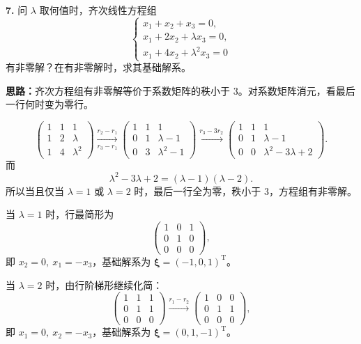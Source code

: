 \else \answerarea[10] \fi%

\textbf{7.} 问 \(\lambda\) 取何值时，齐次线性方程组
\[
\begin{cases}
x_1+x_2+x_3=0,\\
x_1+2x_2+\lambda x_3=0,\\
x_1+4x_2+\lambda^2x_3=0
\end{cases}
\]
有非零解？在有非零解时，求其基础解系。

\ifshowsolutions%
\textbf{思路：}齐次方程组有非零解等价于系数矩阵的秩小于 \(3\)。对系数矩阵消元，看最后一行何时变为零行。

\[
\begin{pmatrix}1&1&1\\1&2&\lambda\\1&4&\lambda^2\end{pmatrix}
\xrightarrow[r_3-r_1]{r_2-r_1}
\begin{pmatrix}1&1&1\\0&1&\lambda-1\\0&3&\lambda^2-1\end{pmatrix}
\xrightarrow{r_3-3r_2}
\begin{pmatrix}1&1&1\\0&1&\lambda-1\\0&0&\lambda^2-3\lambda+2\end{pmatrix}.
\]
而
\[
\lambda^2-3\lambda+2=(\lambda-1)(\lambda-2).
\]
所以当且仅当 \(\lambda=1\) 或 \(\lambda=2\) 时，最后一行全为零，秩小于 \(3\)，方程组有非零解。

当 \(\lambda=1\) 时，行最简形为
\[
\begin{pmatrix}1&0&1\\0&1&0\\0&0&0\end{pmatrix},
\]
即 \(x_2=0,\ x_1=-x_3\)，基础解系为 \(\boldsymbol\xi=(-1,0,1)^{\mathrm T}\)。

当 \(\lambda=2\) 时，由行阶梯形继续化简：
\[
\begin{pmatrix}1&1&1\\0&1&1\\0&0&0\end{pmatrix}
\xrightarrow{r_1-r_2}
\begin{pmatrix}1&0&0\\0&1&1\\0&0&0\end{pmatrix},
\]
即 \(x_1=0,\ x_2=-x_3\)，基础解系为 \(\boldsymbol\xi=(0,1,-1)^{\mathrm T}\)。


